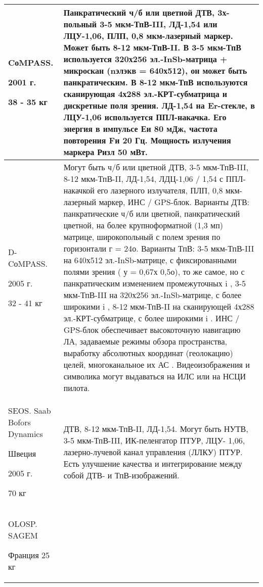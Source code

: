 \begin{landscape}
\begin{longtable}{| p{6cm} | p{18cm} |}
	\\ \hline
		CоMPASS.		
		
		2001 г. 	
		
		38 - 35 кг      
& 
Панкратический ч/б или цветной ДТВ, 3х-польный 3-5 мкм-ТпВ-III, ЛД-1,54 или ЛЦУ-1,06, ПЛП, 0,8 
мкм-лазерный маркер. Может быть 8-12 мкм-ТпВ-II. В 3-5 мкм-ТпВ используется 320х256 эл.-InSb-матрица + микроскан (nэлэкв = 640х512), он может быть 
панкратическим. В 8-12 мкм-ТпВ используются сканирующая 4х288 эл.-КРТ-субматрица и дискретные 
поля зрения. ЛД-1,54 на Er-стекле, в ЛЦУ-1,06 используется ППЛ-накачка. Его энергия в импульсе Еи 80 мДж, частота повторения Fи 20 Гц. Мощность излучения маркера Ризл 50 мВт. 
    
\\ \hline
		D-CоMPASS.
				
		2005 г. 
			
		32 - 41 кг      
& 
Могут быть ч/б или цветной ДТВ, 3-5 мкм-ТпВ-III, 8-12 мкм-ТпВ-II, ЛД-1,54, ЛДЦ-1,06 / 1,54 с ППЛ- 
накачкой его лазерного излучателя, ПЛП, 0,8 мкм-лазерный маркер, ИНС / GPS-блок. 
Варианты ДТВ: 
панкратические ч/б или цветной,  панкратический цветной, на более крупноформатной (1,3 мп) матрице,  широкопольный с полем зрения по горизонтали г = 24о. 
Варианты ТпВ: 
3-5 мкм-ТпВ-III на 640х512 эл.-InSb-матрице, с фиксированными полями зрения ( у = 0,67х 0,5о),  то же самое, но с панкратическим изменением промежуточных i ,  3-5 мкм-ТпВ-III на 320х256 эл.-InSb-матрице, с более широкими i ,  8-12 мкм-ТпВ-II на сканирующей 4х288 эл.-КРТ-субматрице, с более широкими i . 
ИНС / GPS-блок обеспечивает высокоточную навигацию ЛА, задаваемые режимы обзора пространства, выработку абсолютных координат (геолокацию) целей, многоканальное их АС 
. Видеоизображения и символика могут выдаваться на ИЛС или на НСЦИ пилота. 
    
\\ \hline
	SEOS. Saab Bofors Dynamics \cite[]{doi:10.1117/12.450557}
	
	Швеция	
	
	2005 г. 	
	
	70 кг	      
& 
ДТВ, 8-12 мкм-ТпВ-II, ЛД-1,54. Могут быть НУТВ, 3-5 мкм-ТпВ-III, ИК-пеленгатор ПТУР, ЛЦУ-
1,06, лазерно-лучевой канал управления (ЛЛКУ) ПТУР.
Есть улучшение качества и интегрирование между собой ДТВ- и ТпВ-изображений.
   
\\ \hline
		OLOSP. SAGEM
		\cite[]{sagem-olosp}
		
		Франция		25 кг
		 

\end{longtable}
\end{landscape}
